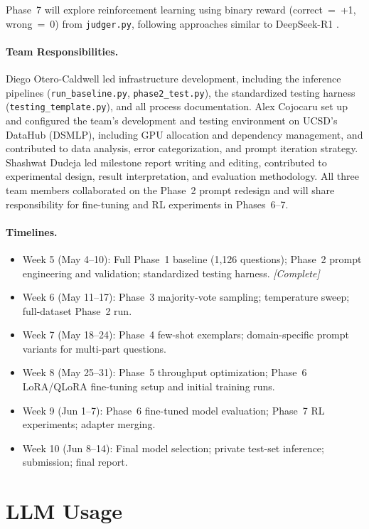 \documentclass{article}
\begin{document}
Phase~7 will explore reinforcement learning using binary reward (correct~=~+1, wrong~=~0) from \texttt{judger.py}, following approaches similar to DeepSeek-R1 \citep{deepseekr1}.

\paragraph{Team Responsibilities.}
Diego Otero-Caldwell led infrastructure development, including the inference pipelines (\texttt{run\_baseline.py}, \texttt{phase2\_test.py}), the standardized testing harness (\texttt{testing\_template.py}), and all process documentation. Alex Cojocaru set up and configured the team's development and testing environment on UCSD's DataHub (DSMLP), including GPU allocation and dependency management, and contributed to data analysis, error categorization, and prompt iteration strategy. Shashwat Dudeja led milestone report writing and editing, contributed to experimental design, result interpretation, and evaluation methodology. All three team members collaborated on the Phase~2 prompt redesign and will share responsibility for fine-tuning and RL experiments in Phases~6--7.

\paragraph{Timelines.}
\begin{itemize}
    \item Week 5 (May 4--10): Full Phase~1 baseline (1,126 questions); Phase~2 prompt engineering and validation; standardized testing harness. \textit{[Complete]}
    \item Week 6 (May 11--17): Phase~3 majority-vote sampling; temperature sweep; full-dataset Phase~2 run.
    \item Week 7 (May 18--24): Phase~4 few-shot exemplars; domain-specific prompt variants for multi-part questions.
    \item Week 8 (May 25--31): Phase~5 throughput optimization; Phase~6 LoRA/QLoRA fine-tuning setup and initial training runs.
    \item Week 9 (Jun 1--7): Phase~6 fine-tuned model evaluation; Phase~7 RL experiments; adapter merging.
    \item Week 10 (Jun 8--14): Final model selection; private test-set inference; submission; final report.
\end{itemize}


\section*{LLM Usage}
\end{document}
